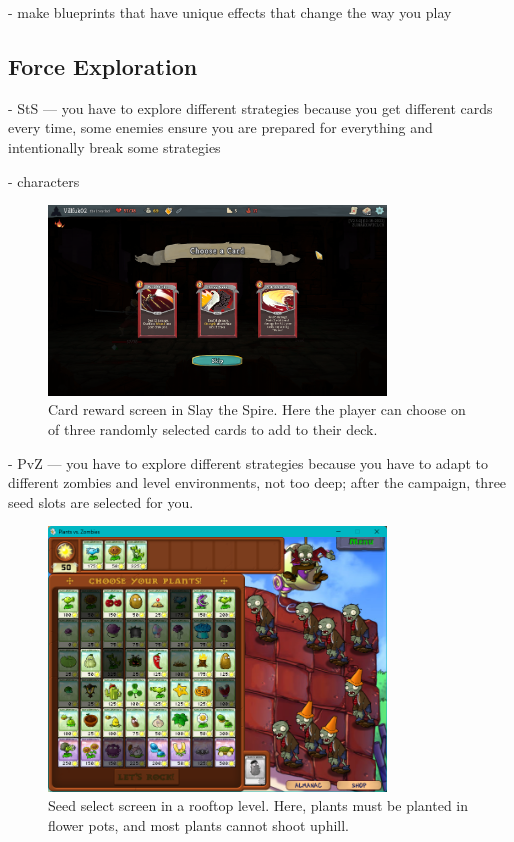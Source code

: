 - make blueprints that have unique effects that change the way you play

\subsection{Force Exploration}

- StS --- you have to explore different strategies because you get different cards every time, some enemies ensure you are prepared for everything and intentionally break some strategies

- characters

\begin{figure}[htb]
    \centering
    \includegraphics[width=0.8\textwidth]{img/Slay-the-Spire-Reward.png}
    \caption{Card reward screen in Slay the Spire. Here the player can choose on of three randomly selected cards to add to their deck.}
    \label{fig:slay-the-spire-reward}
\end{figure}

- PvZ --- you have to explore different strategies because you have to adapt to different zombies and level environments, not too deep; after the campaign, three seed slots are selected for you.

\begin{figure}[htb]
    \centering
    \includegraphics[width=0.8\textwidth]{img/Plants-vs-Zombies-Rooftop.png}
    \caption{Seed select screen in a rooftop level. Here, plants must be planted in flower pots, and most plants cannot shoot uphill.}
    \label{fig:plants-vs-zombies-roof}
\end{figure}

